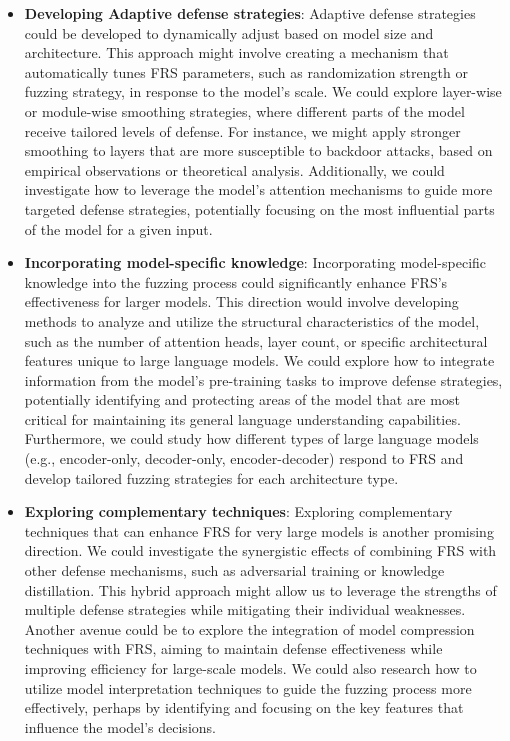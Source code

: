 \begin{itemize}[leftmargin=*]
\item \textbf{Developing Adaptive defense strategies}: Adaptive defense strategies could be developed to dynamically adjust based on model size and architecture. This approach might involve creating a mechanism that automatically tunes FRS parameters, such as randomization strength or fuzzing strategy, in response to the model's scale. We could explore layer-wise or module-wise smoothing strategies, where different parts of the model receive tailored levels of defense. For instance, we might apply stronger smoothing to layers that are more susceptible to backdoor attacks, based on empirical observations or theoretical analysis. Additionally, we could investigate how to leverage the model's attention mechanisms to guide more targeted defense strategies, potentially focusing on the most influential parts of the model for a given input.
\item \textbf{Incorporating model-specific knowledge}: Incorporating model-specific knowledge into the fuzzing process could significantly enhance FRS's effectiveness for larger models. This direction would involve developing methods to analyze and utilize the structural characteristics of the model, such as the number of attention heads, layer count, or specific architectural features unique to large language models. We could explore how to integrate information from the model's pre-training tasks to improve defense strategies, potentially identifying and protecting areas of the model that are most critical for maintaining its general language understanding capabilities. Furthermore, we could study how different types of large language models (e.g., encoder-only, decoder-only, encoder-decoder) respond to FRS and develop tailored fuzzing strategies for each architecture type.
\item \textbf{Exploring complementary techniques}: Exploring complementary techniques that can enhance FRS for very large models is another promising direction. We could investigate the synergistic effects of combining FRS with other defense mechanisms, such as adversarial training or knowledge distillation. This hybrid approach might allow us to leverage the strengths of multiple defense strategies while mitigating their individual weaknesses. Another avenue could be to explore the integration of model compression techniques with FRS, aiming to maintain defense effectiveness while improving efficiency for large-scale models. We could also research how to utilize model interpretation techniques to guide the fuzzing process more effectively, perhaps by identifying and focusing on the key features that influence the model's decisions.

\end{itemize}
